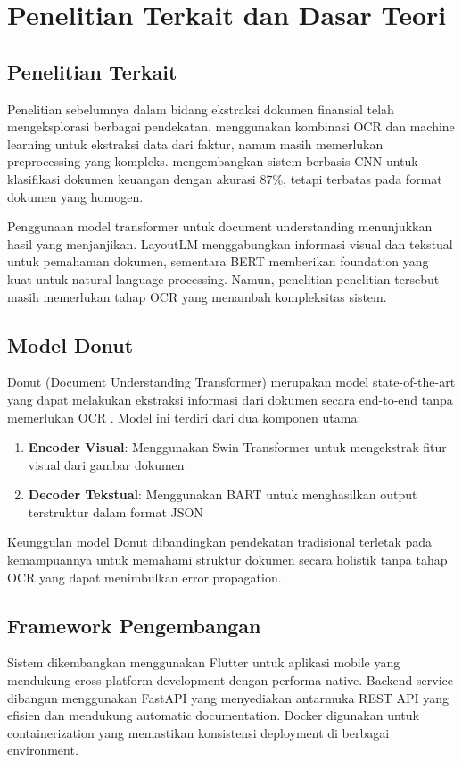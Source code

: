 \section{Penelitian Terkait dan Dasar Teori}

\subsection{Penelitian Terkait}
Penelitian sebelumnya dalam bidang ekstraksi dokumen finansial telah mengeksplorasi berbagai pendekatan. \cite{penelitian1} menggunakan kombinasi OCR dan machine learning untuk ekstraksi data dari faktur, namun masih memerlukan preprocessing yang kompleks. \cite{penelitian2} mengembangkan sistem berbasis CNN untuk klasifikasi dokumen keuangan dengan akurasi 87\%, tetapi terbatas pada format dokumen yang homogen.

Penggunaan model transformer untuk document understanding menunjukkan hasil yang menjanjikan. LayoutLM \cite{layoutlm} menggabungkan informasi visual dan tekstual untuk pemahaman dokumen, sementara BERT \cite{bert} memberikan foundation yang kuat untuk natural language processing. Namun, penelitian-penelitian tersebut masih memerlukan tahap OCR yang menambah kompleksitas sistem.

\subsection{Model Donut}
Donut (Document Understanding Transformer) merupakan model state-of-the-art yang dapat melakukan ekstraksi informasi dari dokumen secara end-to-end tanpa memerlukan OCR \cite{donut}. Model ini terdiri dari dua komponen utama:

\begin{enumerate}
    \item \textbf{Encoder Visual}: Menggunakan Swin Transformer untuk mengekstrak fitur visual dari gambar dokumen
    \item \textbf{Decoder Tekstual}: Menggunakan BART untuk menghasilkan output terstruktur dalam format JSON
\end{enumerate}

Keunggulan model Donut dibandingkan pendekatan tradisional terletak pada kemampuannya untuk memahami struktur dokumen secara holistik tanpa tahap OCR yang dapat menimbulkan error propagation.

\subsection{Framework Pengembangan}
Sistem dikembangkan menggunakan Flutter untuk aplikasi mobile yang mendukung cross-platform development dengan performa native. Backend service dibangun menggunakan FastAPI yang menyediakan antarmuka REST API yang efisien dan mendukung automatic documentation. Docker digunakan untuk containerization yang memastikan konsistensi deployment di berbagai environment.

